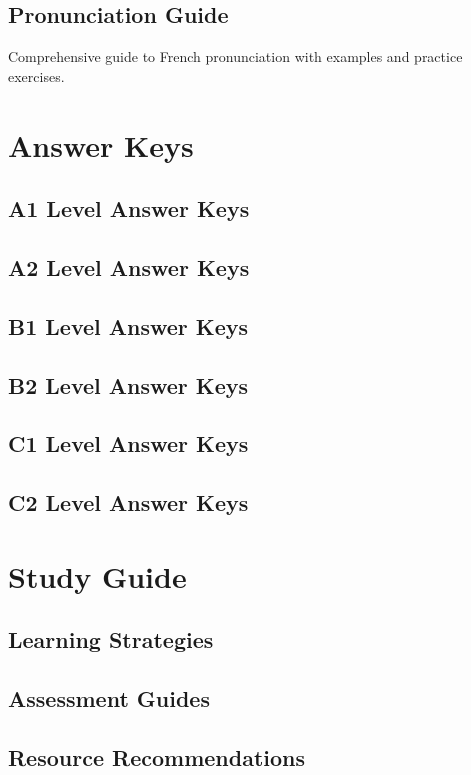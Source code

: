 \chapter{Pronunciation Guide}
\label{chap:pronunciation}

Comprehensive guide to French pronunciation with examples and practice exercises.


\part{Answer Keys}
\label{part:answers}

\chapter{A1 Level Answer Keys}
\label{chap:answers-a1}
\chapter{A2 Level Answer Keys}
\label{chap:answers-a2}
\chapter{B1 Level Answer Keys}
\label{chap:answers-b1}
\chapter{B2 Level Answer Keys}
\label{chap:answers-b2}
\chapter{C1 Level Answer Keys}
\label{chap:answers-c1}
\chapter{C2 Level Answer Keys}
\label{chap:answers-c2}


\part{Study Guide}
\label{part:studyguide}

\chapter{Learning Strategies}
\label{chap:strategies}
\chapter{Assessment Guides}
\label{chap:assessment}
\chapter{Resource Recommendations}
\label{chap:resources}


